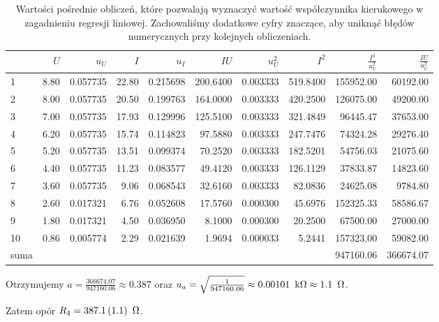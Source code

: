 \documentclass[a4paper]{article}
\begin{document}
\begin{table}
\centering
\begin{tabular}{lrrrrrrrrr}
\toprule
{} &     $U$ &       $u_U$ &      $I$ &       $u_I$ &       $IU$ &     $u_U^2$ &       $I^2$ &    $\frac{I^2}{u_U^2}$ & $\frac{IU}{u_U^2}$ \\
\midrule
1 &  8.80 &  0.057735 &  22.80 &  0.215698 &  200.6400 &  0.003333 &  519.8400 &  155952.00 &  60192.00 \\
2 &  8.00 &  0.057735 &  20.50 &  0.199763 &  164.0000 &  0.003333 &  420.2500 &  126075.00 &  49200.00 \\
3 &  7.00 &  0.057735 &  17.93 &  0.129996 &  125.5100 &  0.003333 &  321.4849 &   96445.47 &  37653.00 \\
4 &  6.20 &  0.057735 &  15.74 &  0.114823 &   97.5880 &  0.003333 &  247.7476 &   74324.28 &  29276.40 \\
5 &  5.20 &  0.057735 &  13.51 &  0.099374 &   70.2520 &  0.003333 &  182.5201 &   54756.03 &  21075.60 \\
6 &  4.40 &  0.057735 &  11.23 &  0.083577 &   49.4120 &  0.003333 &  126.1129 &   37833.87 &  14823.60 \\
7 &  3.60 &  0.057735 &   9.06 &  0.068543 &   32.6160 &  0.003333 &   82.0836 &   24625.08 &   9784.80 \\
8 &  2.60 &  0.017321 &   6.76 &  0.052608 &   17.5760 &  0.000300 &   45.6976 &  152325.33 &  58586.67 \\
9 &  1.80 &  0.017321 &   4.50 &  0.036950 &    8.1000 &  0.000300 &   20.2500 &   67500.00 &  27000.00 \\
10 &  0.86 &  0.005774 &   2.29 &  0.021639 &    1.9694 &  0.000033 &    5.2441 &  157323.00 &  59082.00 \\
\midrule
	suma & {} & {} & {} & {} & {} & {} & {} & 947160.06 & 366674.07 \\
\bottomrule
\end{tabular}
\caption{Wartości pośrednie obliczeń, które pozwalają wyznaczyć wartość współczynnika kierukowego w zagadnieniu regresji liniowej. Zachowaliśmy dodatkowe cyfry znaczące, aby uniknąć błędów numerycznych przy kolejnych obliczeniach.}
\end{table}

Otrzymujemy $a = \frac{366674.07}{947160.06} \approx 0.387$ oraz $u_a = \sqrt{\frac{1}{947160.06}} \approx 0.00101 \enskip \text{k}\Omega \approx 1.1 \enskip \Omega$.

Zatem opór $R_4 = 387.1 \, (1.1) \enskip \Omega$.
\end{document}
